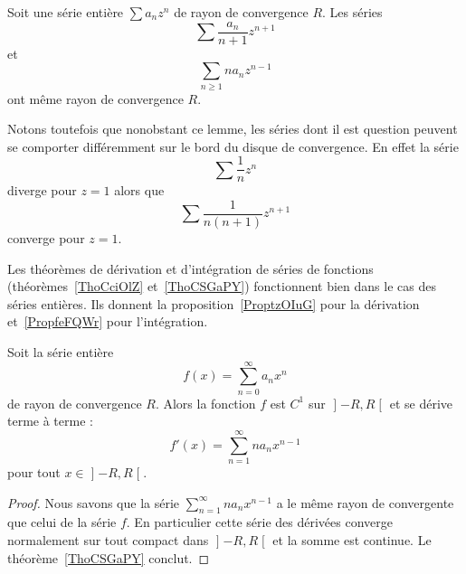 \begin{lemma}       \label{LemFVMaSD}
	Soit une série entière \( \sum a_nz^n\) de rayon de convergence \( R\). Les séries
	\begin{equation}
		\sum \frac{ a_n }{ n+1 }z^{n+1}
	\end{equation}
	et
	\begin{equation}
		\sum_{n\geq 1}na_nz^{n-1}
	\end{equation}
	ont même rayon de convergence \( R\).
\end{lemma}

Notons toutefois que nonobstant ce lemme, les séries dont il est question peuvent se comporter différemment sur le bord du disque de convergence. En effet la série
\begin{equation}
	\sum \frac{1}{ n }z^n
\end{equation}
diverge pour \( z=1\) alors que
\begin{equation}
	\sum\frac{1}{ n(n+1) }z^{n+1}
\end{equation}
converge pour \( z=1\).


Les théorèmes de dérivation et d'intégration de séries de fonctions (théorèmes~\ref{ThoCciOlZ} et~\ref{ThoCSGaPY}) fonctionnent bien dans le cas des séries entières. Ils donnent la proposition~\ref{ProptzOIuG} pour la dérivation et~\ref{PropfeFQWr} pour l'intégration.

\begin{proposition}     \label{ProptzOIuG}
	Soit la série entière
	\begin{equation}
		f(x)=\sum_{n=0}^{\infty}a_n x^n
	\end{equation}
	de rayon de convergence \( R\). Alors la fonction \( f\) est \( C^1\) sur \( \mathopen] -R , R \mathclose[\) et se dérive terme à terme :
		\begin{equation}
			f'(x)=\sum_{n=1}^{\infty}na_nx^{n-1}
		\end{equation}
		pour tout \( x\in\mathopen] -R , R \mathclose[\).
\end{proposition}

\begin{proof}
	Nous savons que la série \( \sum_{n=1}^{\infty}na_nx^{n-1}\) a le même rayon de convergente que celui de la série \( f\). En particulier cette série des dérivées converge normalement sur tout compact dans \( \mathopen] -R , R \mathclose[\) et la somme est continue. Le théorème~\ref{ThoCSGaPY} conclut.
\end{proof}

